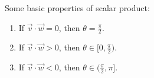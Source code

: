 \begin{note}
  Some basic properties of scalar product:
  \begin{enumerate}
    \item If $\vec{v} \cdot \vec{w} = 0$, then $\theta = \frac{\pi}{2}$.
    \item If $\vec{v} \cdot \vec{w} > 0$, then $\theta \in [0, \frac{\pi}{2})$.
    \item If $\vec{v} \cdot \vec{w} < 0$, then $\theta \in (\frac{\pi}{2}, \pi]$.
  \end{enumerate}
\end{note}
